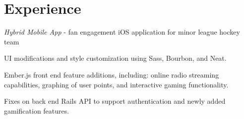 \documentclass[]{deedy-resume-openfont}
\begin{document}
\hfill
\begin{minipage}[t]{0.66\textwidth} 


\section{Experience}

\textit{Hybrid Mobile App} - fan engagement iOS application for minor league hockey team
\vspace{\topsep} %
\begin{tightemize}
\item UI modifications and style customization using Sass, Bourbon, and Neat.
\item Ember.js front end feature additions, including: online radio streaming capabilities, graphing of user points, and interactive gaming functionality.
\item Fixes on back end Rails API to support authentication and newly added gamification features.
\end{tightemize}
\sectionsep


\end{minipage}
\end{document}
